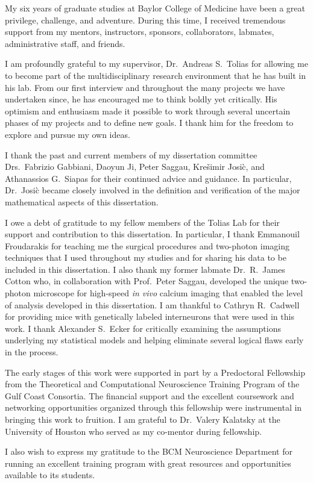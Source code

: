 My six years of graduate studies at Baylor College of Medicine have been a great privilege, challenge, and adventure. During this time, I received tremendous support from my mentors, instructors, sponsors, collaborators, labmates, administrative staff, and friends.

I am profoundly grateful to my supervisor, Dr.\ Andreas S.\ Tolias for allowing me to become part of the multidisciplinary research environment that he has built in his lab. From our first interview and throughout the many projects we have undertaken since, he has encouraged me to think boldly yet critically.  His optimism and enthusiasm made it possible to work through several uncertain phases of my projects and to define new goals.  I thank him for the freedom to explore and pursue my own ideas.

I thank the past and current members of my dissertation committee Drs.\ Fabrizio Gabbiani, Daoyun Ji, Peter Saggau, Kre\v{s}imir Josi\`c, and Athanassios G.\ Siapas  for their continued advice and guidance. In particular, Dr.\ Josi\`c became closely involved in the definition and verification of the major mathematical aspects of this dissertation.

I owe a debt of gratitude to my fellow members of the Tolias Lab for their support and contribution to this dissertation.  In particular, I thank Emmanouil Froudarakis for teaching me the surgical procedures and two-photon imaging techniques that I used throughout my studies and for sharing his data to be included in this dissertation. I also thank my former labmate Dr.\ R.\ James Cotton who, in collaboration with Prof.~Peter Saggau, developed the unique two-photon microscope for high-speed \emph{in vivo} calcium imaging that enabled the level of analysis developed in this dissertation. I am thankful to Cathryn R.\ Cadwell for providing mice with genetically labeled interneurons that were used in this work. I thank Alexander S.\ Ecker for critically examining the assumptions underlying my statistical models and helping eliminate several logical flaws early in the process.

The early stages of this  work were supported in part by a Predoctoral Fellowship from the Theoretical and Computational Neuroscience Training Program of the Gulf Coast Consortia.  The financial support and the excellent coursework and networking opportunities organized through this fellowship were instrumental in bringing this work to fruition. I am grateful to Dr.\ Valery Kalatsky at the University of Houston who served as my co-mentor during fellowship.

I also wish to express my gratitude to the BCM Neuroscience Department for running an excellent training program with great resources and opportunities available to its students.
